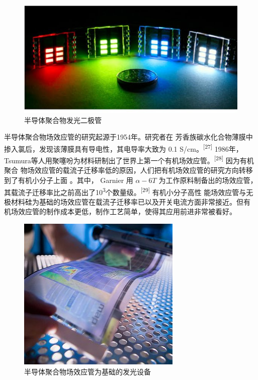 \documentclass[12pt,]{report}
\begin{document}
\begin{figure}[h!]
    \centering
    \includegraphics[scale=0.6]{./figures/pled.jpeg}
    \caption{半导体聚合物发光二极管}
    \label{fig:pled}
\end{figure}

半导体聚合物场效应管的研究起源于1954年。研究者在
芳香族碳水化合物薄膜中掺入氯后，发现该薄膜具有导电性，其电导率大致为 0.1
S/cm。\textsuperscript{{[}27{]}}
1986年，Tsumura等人用聚噻吩为材料研制出了世界上第一个有机场效应管。\textsuperscript{{[}28{]}}
因为有机聚合
物场效应管的载流子迁移率低的原因，人们把有机场效应管的研究方向转移到了有机小分子上面
。其中， Garnier 用 \(\alpha-6T\)
为工作原料制备出的场效应管，其载流子迁移率比之前高出了10\textsuperscript{3}个数量级。\textsuperscript{{[}29{]}}
有机小分子高性
能场效应管与无极材料硅为基础的场效应管在载流子迁移率已以及开关电流方面非常接近。但有
机场效应管的制作成本更低，制作工艺简单，使得其应用前进非常被看好。

\begin{figure}[h!]
    \centering
    \includegraphics[scale=0.6]{./figures/ofet.jpg}
    \caption{半导体聚合物场效应管为基础的发光设备}
    \label{fig:ofet}
\end{figure}
\end{document}

